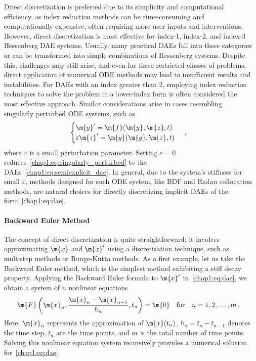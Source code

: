 Direct discretization is preferred due to its simplicity and computational efficiency, as index reduction methods can be time-consuming and computationally expensive, often requiring more user inputs and interventions. However, direct discretization is most effective for index-1, index-2, and index-3 Hessenberg \ac{DAE} systems. Usually, many practical \acp{DAE} fall into these categories or can be transformed into simple combinations of Hessenberg systems. Despite this, challenges may still arise, and even for these restricted classes of problems, direct application of numerical \ac{ODE} methods may lead to insufficient results and instabilities. For \acp{DAE} with an index greater than 2, employing index reduction techniques to solve the problem in a lower-index form is often considered the most effective approach. Similar considerations arise in cases resembling singularly perturbed \ac{ODE} systems, such as
%
\begin{equation}
  \begin{cases}
  \m{y}^{\prime} = \m{f}(\m{y}, \m{z}, t) \\
  \varepsilon \m{z}^{\prime} = \m{g}(\m{y}, \m{z}, t)
  \end{cases} \, \text{,}
  \label{chap1:eq:singularly_perturbed}
\end{equation}
%
where $\varepsilon$ is a small perturbation parameter. Setting $\varepsilon = 0$ reduces~\eqref{chap1:eq:singularly_perturbed} to the \acp{DAE}~\eqref{chap1:eq:semiexplicit_dae}. In general, due to the system's stiffness for small $\varepsilon$, methods designed for such \ac{ODE} system, like \ac{BDF} and Radau collocation methods, are natural choices for directly discretizing implicit \acp{DAE} of the form~\eqref{chap1:eq:dae}.

\paragraph{Backward Euler Method}

The concept of direct discretization is quite straightforward: it involves approximating $\m{x}$ and $\m{x}^{\prime}$ using a discretization technique, such as multistep methods or Runge-Kutta methods. As a first example, let us take the Backward Euler method, which is the simplest method exhibiting a stiff decay property. Applying the Backward Euler formula to $\m{x}^{\prime}$ in~\eqref{chap1:eq:dae}, we obtain a system of $n$ nonlinear equations
\begin{equation}
  \m{F}\left(\m{x}_n, \dfrac{\m{x}_n - \m{x}_{n-1}}{h_n}, t_n\right) = \m{0} \quad \text{for} \quad n = 1, 2, \dots, m \, \text{.}
  \label{chap1:eq:backward_euler}
\end{equation}
%
Here, $\m{x}_n$ represents the approximation of $\m{x}(t_n)$, $h_n = t_n - t_{n-1}$ denotes the time step, $t_n$ are the time points, and $m$ is the total number of time points. Solving this nonlinear equation system recursively provides a numerical solution for~\eqref{chap1:eq:dae}.

